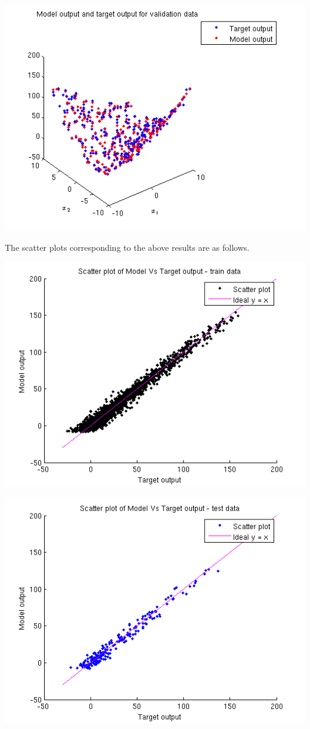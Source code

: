 \documentclass{article}
\begin{document}
\begin{center}
\includegraphics[scale=.6]{Regression/bivar/nu/plot_val}
\end{center}
The scatter plots corresponding to the above results are as follows.
\begin{center}
\includegraphics[scale=.6]{Regression/bivar/nu/scatter_train}
\end{center}
\begin{center}
\includegraphics[scale=.6]{Regression/bivar/nu/scatter_test}
\end{center}
\end{document}
